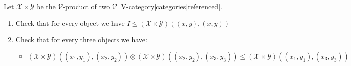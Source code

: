 
Let $\mathcal{X} \times \mathcal{Y}$ be the $\mathcal{V}$-product of two $\mathcal{V}$ \ref{V-category|categories|referenced}.
    \begin{enumerate}
      \item Check that for every object we have $I \leq (\mathcal{X} \times \mathcal{Y})((x,y),(x,y))$
      \item Check that for every three objects we have:
            \begin{itemize}
              \item $(\mathcal{X} \times \mathcal{Y})((x_1,y_1),(x_2,y_2)) \otimes (\mathcal{X} \times \mathcal{Y})((x_2,y_2),(x_3,y_3)) \leq (\mathcal{X} \times \mathcal{Y})((x_1,y_1),(x_3,y_3))$
            \end{itemize}
    \end{enumerate}